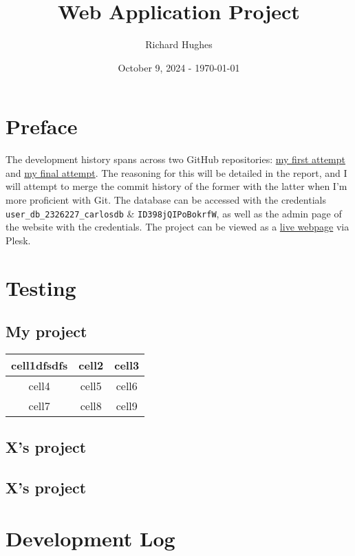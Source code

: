 \documentclass{article}
\title{Web Application Project}
\author{Richard Hughes}
\date{October 9, 2024 - \today}
\begin{document}
\maketitle
\newpage

\section*{Preface}
  The development history spans across two GitHub repositories: 
  \href{https://github.com/richardh05/Web-Application-Development-J110823}{my first attempt} and 
  \href{https://github.com/richardh05/Carlos-Pizza}{my final attempt}.
  The reasoning for this will be detailed in the report, and I will attempt to merge the commit history of the former with the latter when I'm more proficient with Git. The database can be accessed with the credentials 
  \verb|user_db_2326227_carlosdb| \& \verb|ID398jQIPoBokrfW|, 
  as well as the admin page of the website with the credentials. The project can be viewed as a \href{https://2326227.win.studentwebserver.co.uk/CO5227}{live webpage} via Plesk.

\tableofcontents
\newpage


\section{Testing}
  \subsection{My project}
  \begin{center}
    \begin{tabular}{|c|c|c|}
      \hline
      cell1dfsdfs & cell2 & cell3 \\
      \hline 
      cell4 & cell5 & cell6 \\  
      cell7 & cell8 & cell9 \\ 
      \hline
    \end{tabular}
    \end{center}
  \subsection{X's project}
  \subsection{X's project}


\section{Development Log}
\end{document}
